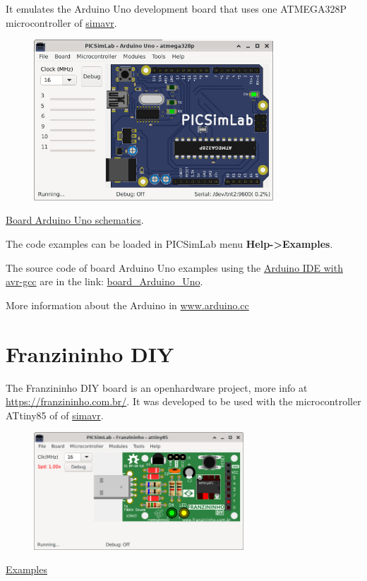 It emulates the Arduino Uno development board that uses one ATMEGA328P microcontroller of \href{https://github.com/buserror/simavr}{simavr}.

\begin{figure}[H]
\center
\includegraphics[width=0.80\textwidth]{img/picsimlab5.png} 
\end{figure} 

\href{https://www.arduino.cc/en/uploads/Main/Arduino_Uno_Rev3-schematic.pdf}{Board Arduino Uno schematics}.\vspace{0.5cm}

The code examples can be loaded in PICSimLab menu \textbf{Help->Examples}.

The source code of board Arduino Uno examples using the 
\href{https://www.arduino.cc/en/Main/Software}{Arduino IDE with avr-gcc} are in the link: 
\href{https://lcgamboa.github.io/picsimlab_examples/board_Arduino_Uno.html}{board\_Arduino\_Uno}.

More information about the Arduino in \href{https://www.arduino.cc/}{www.arduino.cc}

\section{Franzininho DIY}

The Franzininho DIY board is an openhardware project, more info at \href{https://franzininho.com.br/}{https://franzininho.com.br/}.
It was developed to be used with the microcontroller ATtiny85 of 
of \href{https://github.com/buserror/simavr}{simavr}.

\begin{figure}[H]
\center
\includegraphics[width=0.7\textwidth]{img/board_Franzininho_DIY.png} 
\end{figure} 

\href{https://lcgamboa.github.io/picsimlab_examples/board_Franzininho_DIY.html}{Examples}

